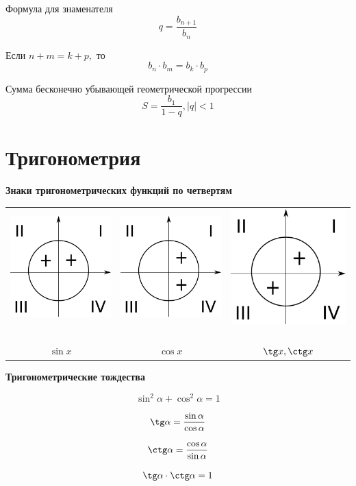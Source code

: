 \documentclass[a5paper, 8pt]{extarticle}
\begin{document}
Формула для знаменателя
$$q=\frac{b_{n+1}}{b_n}$$

Если $n+m=k+p,$ то
$$b_n\cdot b_m=b_k\cdot b_p$$

Сумма бесконечно убывающей геометрической прогрессии
$$S=\frac{b_1}{1-q}, |q|<1$$

\section{Тригонометрия}

\textbf{Знаки тригонометрических функций по четвертям}

\begin{center}
\begin{tabular}{ccc}
\includegraphics[width=0.25\linewidth]{img01.png} \ & \includegraphics[width=0.25\linewidth]{img02.png} \ & \includegraphics[width=0.25\linewidth]{img03.png} \ \\ 
$\sin x$ & $\cos x$ & $\tg x, \ctg x$ \\ 
\end{tabular} 
\end{center}

\textbf{Тригонометрические тождества}

$$\sin^2\alpha+\cos^2\alpha=1$$

$$\tg\alpha =\frac{\sin\alpha}{\cos\alpha}$$

$$\ctg\alpha =\frac{\cos\alpha}{\sin\alpha}$$

$$\tg\alpha \cdot \ctg\alpha = 1$$
\end{document}
